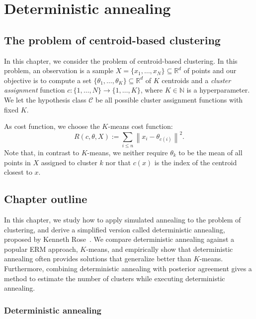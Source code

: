 \chapter{Deterministic annealing}
\label{ch:da}

\section{The problem of centroid-based clustering}
\label{sec:problem}

In this chapter, we consider the problem of centroid-based clustering. In
this problem, an observation is a sample $X = \{x_1, \ldots, x_N\} \subseteq \mathbb{R}^d$ of points
and our objective is to compute a set $\{\theta_1, \ldots, \theta_K\} \subseteq \mathbb{R}^d$ of $K$ centroids and a \emph{cluster assignment} function $c : \{1, \ldots, N\} \to \{1, \ldots, K\}$, where $K \in \mathbb{N}$ is a hyperparameter.
We let the hypothesis class $\mathcal{C}$ be all possible cluster assignment functions with fixed $K$.

As cost function, we choose the $K$-means cost function:
%
\begin{equation}
R(c, \theta, X) := \sum_{i \leq n} \left\|x_i - \theta_{c(i)}\right\|^2.
\label{eq:k_means_cost_fun}
\end{equation}
%
Note that, in contrast to $K$-means, we neither require $\theta_k$ to be the mean of all points in $X$ assigned to cluster $k$ nor that $c(x)$ is the index of the centroid closest to $x$.

\section{Chapter outline}
\label{sec:chapter_outline}

In this chapter, we study how to apply simulated annealing to the problem
of clustering, and derive a simplified version called deterministic annealing, proposed by Kenneth Rose~\cite{rose1998deterministic}. We compare deterministic annealing
against a popular ERM approach, $K$-means, and empirically show that deterministic annealing often provides solutions that generalize better than
$K$-means. Furthermore, combining deterministic annealing with posterior
agreement gives a method to estimate the number of clusters while executing
deterministic annealing.

\subsection*{Deterministic annealing}

